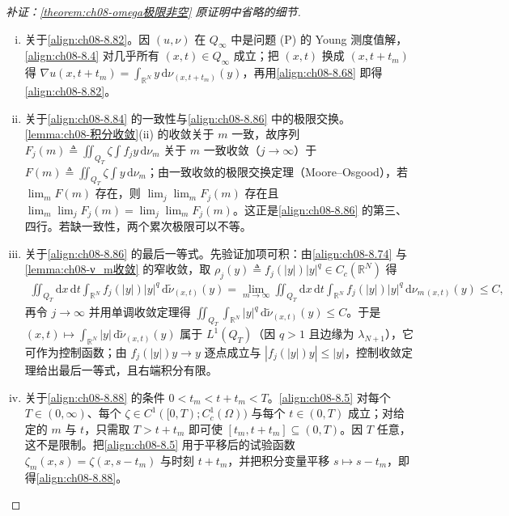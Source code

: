 \documentclass[../../main.tex]{subfiles}%
\begin{document}
\begin{proof}[补证：\cref{theorem:ch08-omega极限非空} 原证明中省略的细节]
\begin{enumerate}[(i)]
\item 关于\eqref{align:ch08-8.82}。因 $(u,\nu)$ 在 $Q_\infty$ 中是问题 (P) 的 Young 测度值解，\eqref{align:ch08-8.4} 对几乎所有 $(x,t)\in Q_\infty$ 成立；把 $(x,t)$ 换成 $(x,t+t_m)$ 得 $\nabla u(x,t+t_m)=\int_{\mathbb{R}^N}y\,\mathrm{d}\nu_{(x,t+t_m)}(y)$，再用\eqref{align:ch08-8.68} 即得\eqref{align:ch08-8.82}。
\item 关于\eqref{align:ch08-8.84} 的一致性与\eqref{align:ch08-8.86} 中的极限交换。\cref{lemma:ch08-积分收敛}(ii) 的收敛关于 $m$ 一致，故序列 $F_j(m)\triangleq\iint_{Q_T}\zeta\int f_jy\,\mathrm{d}\nu_m$ 关于 $m$ 一致收敛（$j\to\infty$）于 $F(m)\triangleq\iint_{Q_T}\zeta\int y\,\mathrm{d}\nu_m$；由一致收敛的极限交换定理（Moore--Osgood），若 $\lim_mF(m)$ 存在，则 $\lim_j\lim_mF_j(m)$ 存在且 $\lim_m\lim_jF_j(m)=\lim_j\lim_mF_j(m)$。这正是\eqref{align:ch08-8.86} 的第三、四行。若缺一致性，两个累次极限可以不等。
\item 关于\eqref{align:ch08-8.86} 的最后一等式。先验证加项可积：由\eqref{align:ch08-8.74} 与\cref{lemma:ch08-ν_m收敛} 的窄收敛，取 $\rho_j(y)\triangleq f_j(|y|)|y|^q\in C_c(\mathbb{R}^N)$ 得
\begin{align*}
\iint_{Q_T}\mathrm{d}x\,\mathrm{d}t\int_{\mathbb{R}^N}f_j(|y|)|y|^q\,\mathrm{d}\tilde\nu_{(x,t)}(y)
=\lim_{m\to\infty}\iint_{Q_T}\mathrm{d}x\,\mathrm{d}t\int_{\mathbb{R}^N}f_j(|y|)|y|^q\,\mathrm{d}\nu_{m\,(x,t)}(y)\leqslant C,
\end{align*}
再令 $j\to\infty$ 并用单调收敛定理得 $\iint_{Q_T}\int_{\mathbb{R}^N}|y|^q\,\mathrm{d}\tilde\nu_{(x,t)}(y)\leqslant C$。于是 $(x,t)\mapsto\int_{\mathbb{R}^N}|y|\,\mathrm{d}\tilde\nu_{(x,t)}(y)$ 属于 $L^1(Q_T)$（因 $q>1$ 且边缘为 $\lambda_{N+1}$），它可作为控制函数；由 $f_j(|y|)y\to y$ 逐点成立与 $|f_j(|y|)y|\leqslant|y|$，控制收敛定理给出最后一等式，且右端积分有限。
\item 关于\eqref{align:ch08-8.88} 的条件 $0<t_m<t+t_m<T$。\eqref{align:ch08-8.5} 对每个 $T\in(0,\infty)$、每个 $\zeta\in C^1([0,T);C^1_c(\Omega))$ 与每个 $t\in(0,T)$ 成立；对给定的 $m$ 与 $t$，只需取 $T>t+t_m$ 即可使 $[t_m,t+t_m]\subseteq(0,T)$。因 $T$ 任意，这不是限制。把\eqref{align:ch08-8.5} 用于平移后的试验函数 $\zeta_m(x,s)=\zeta(x,s-t_m)$ 与时刻 $t+t_m$，并把积分变量平移 $s\mapsto s-t_m$，即得\eqref{align:ch08-8.88}。

\end{enumerate}
\end{proof}
\end{document}
